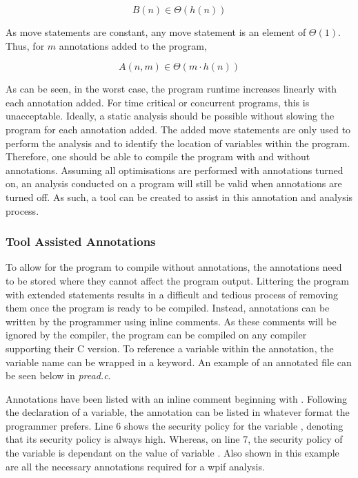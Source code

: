 \[B(n) \in \Theta(h(n))\]

As move statements are constant, any move statement is an element of \(\Theta(1)\). Thus, for \(m\) annotations added to the program, 

\[A(n, m) \in \Theta(m \cdot h(n))\]

As can be seen, in the worst case, the program runtime increases linearly with each annotation added. For time critical or concurrent programs, this is unacceptable. Ideally, a static analysis should be possible without slowing the program for each annotation added. The added move statements are only used to perform the analysis and to identify the location of variables within the program. Therefore, one should be able to compile the program with and without annotations. Assuming all optimisations are performed with annotations turned on, an analysis conducted on a program will still be valid when annotations are turned off. As such, a tool can be created to assist in this annotation and analysis process.

\subsubsection{Tool Assisted Annotations}
\label{subsubsec:inlineTool}

To allow for the program to compile without annotations, the annotations need to be stored where they cannot affect the program output. Littering the program with extended  statements results in a difficult and tedious process of removing them once the program is ready to be compiled. Instead, annotations can be written by the programmer using inline comments. As these comments will be ignored by the compiler, the program can be compiled on any compiler supporting their C version. To reference a variable within the annotation, the variable name can be wrapped in a  keyword. An example of an annotated file can be seen below in \textit{pread.c}.



Annotations have been listed with an inline comment beginning with . Following the declaration of a variable, the annotation can be listed in whatever format the programmer prefers. Line 6 shows the security policy for the variable , denoting that its security policy is always high. Whereas, on line 7, the security policy of the variable  is dependant on the value of variable . Also shown in this example are all the necessary annotations required for a wpif analysis.

